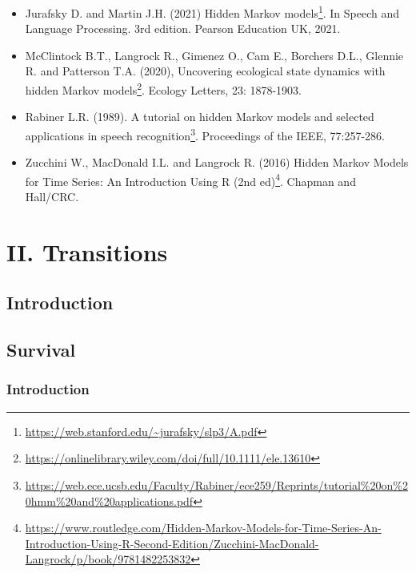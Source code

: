 \documentclass[
  12pt,
]{krantz}
\providecommand{\tightlist}{%
  \setlength{\itemsep}{0pt}\setlength{\parskip}{0pt}}
\renewcommand{\href}[2]{#2\footnote{\url{#1}}}
\begin{document}
\begin{itemize}
\item
  Jurafsky D. and Martin J.H. (2021) \href{https://web.stanford.edu/~jurafsky/slp3/A.pdf}{Hidden Markov models}. In Speech and Language Processing. 3rd edition. Pearson Education UK, 2021.
\item
  McClintock B.T., Langrock R., Gimenez O., Cam E., Borchers D.L., Glennie R. and Patterson T.A. (2020), \href{https://onlinelibrary.wiley.com/doi/full/10.1111/ele.13610}{Uncovering ecological state dynamics with hidden Markov models}. Ecology Letters, 23: 1878-1903.
\item
  Rabiner L.R. (1989). \href{https://web.ece.ucsb.edu/Faculty/Rabiner/ece259/Reprints/tutorial\%20on\%20hmm\%20and\%20applications.pdf}{A tutorial on hidden Markov models and selected applications in speech recognition}. Proceedings of the IEEE, 77:257-286.
\end{itemize}

\begin{itemize}
\tightlist
\item
  Zucchini W., MacDonald I.L. and Langrock R. (2016) \href{https://www.routledge.com/Hidden-Markov-Models-for-Time-Series-An-Introduction-Using-R-Second-Edition/Zucchini-MacDonald-Langrock/p/book/9781482253832}{Hidden Markov Models for Time Series: An Introduction Using R (2nd ed)}. Chapman and Hall/CRC.
\end{itemize}

\hypertarget{part-ii.-transitions}{%
\part{II. Transitions}\label{part-ii.-transitions}}

\hypertarget{introduction-4}{%
\chapter*{Introduction}\label{introduction-4}}


\hypertarget{survival}{%
\chapter{Survival}\label{survival}}

\hypertarget{introduction-5}{%
\section{Introduction}\label{introduction-5}}
\end{document}
